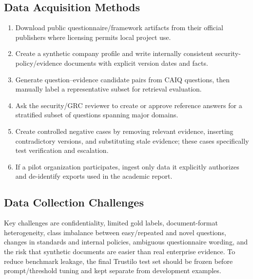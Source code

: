 \documentclass[11pt,journal,onecolumn]{IEEEtran}
\begin{document}
\subsection{Data Acquisition Methods}
\begin{enumerate}[leftmargin=1.7em]
    \item Download public questionnaire/framework artifacts from their official publishers where licensing permits local project use.
    \item Create a synthetic company profile and write internally consistent security-policy/evidence documents with explicit version dates and facts.
    \item Generate question--evidence candidate pairs from CAIQ questions, then manually label a representative subset for retrieval evaluation.
    \item Ask the security/GRC reviewer to create or approve reference answers for a stratified subset of questions spanning major domains.
    \item Create controlled negative cases by removing relevant evidence, inserting contradictory versions, and substituting stale evidence; these cases specifically test verification and escalation.
    \item If a pilot organization participates, ingest only data it explicitly authorizes and de-identify exports used in the academic report.
\end{enumerate}

\subsection{Data Collection Challenges}
Key challenges are confidentiality, limited gold labels, document-format heterogeneity, class imbalance between easy/repeated and novel questions, changes in standards and internal policies, ambiguous questionnaire wording, and the risk that synthetic documents are easier than real enterprise evidence. To reduce benchmark leakage, the final Trustilo test set should be frozen before prompt/threshold tuning and kept separate from development examples.
\end{document}

